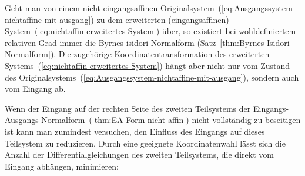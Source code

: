 Geht man von einem nicht eingangsaffinen Originalsystem~(\ref{eq:Ausgangssystem-nichtaffine-mit-ausgang})
zu dem erweiterten (eingangsaffinen) System~(\ref{eq:nichtaffin-erweitertes-System})
über, so existiert bei wohldefiniertem relativen Grad immer die Byrnes-isidori-Normalform
(Satz~\ref{thm:Byrnes-Isidori-Normalform}). Die zugehörige Koordinatentransformation
des erweiterten Systems~(\ref{eq:nichtaffin-erweitertes-System})
hängt aber nicht nur vom Zustand des Originalsystems~(\ref{eq:Ausgangssystem-nichtaffine-mit-ausgang}),
sondern auch vom Eingang ab.

Wenn der Eingang auf der rechten Seite des zweiten Teilsystems der
Eingangs-Ausgangs-Normalform~(\ref{thm:EA-Form-nicht-affin}) nicht
vollständig zu beseitigen ist kann man zumindest versuchen, den Einfluss
des Eingangs auf dieses Teilsystem zu reduzieren. Durch eine geeignete
Koordinatenwahl lässt sich die Anzahl der Differentialgleichungen
des zweiten Teilsystems, die direkt vom Eingang abhängen, minimieren:

